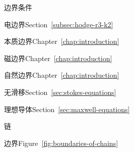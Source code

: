 \par\noindent\hspace*{0em}\label{index:boundary-conditions}{边界条件}

\par\noindent\hspace*{1em}\label{index:boundary-conditions-electric}{电边界}\quad Section~\ref{subsec:hodge-r3-k2}

\par\noindent\hspace*{1em}\label{index:boundary-conditions-essential}{本质边界}\quad Chapter~\ref{chap:introduction}

\par\noindent\hspace*{1em}\label{index:boundary-conditions-magnetic}{磁边界}\quad Chapter~\ref{chap:introduction}

\par\noindent\hspace*{1em}\label{index:boundary-conditions-natural}{自然边界}\quad Chapter~\ref{chap:introduction}

\par\noindent\hspace*{1em}\label{index:boundary-conditions-no-slip}{无滑移}\quad Section~\ref{sec:stokes-equations}

\par\noindent\hspace*{1em}\label{index:boundary-conditions-perfect-conductor}{理想导体}\quad Section~\ref{sec:maxwell-equations}

\par\noindent\hspace*{0em}\label{index:chain}{链}

\par\noindent\hspace*{1em}\label{index:chain-boundary-of}{边界}\quad Figure~\ref{fig:boundaries-of-chains}

